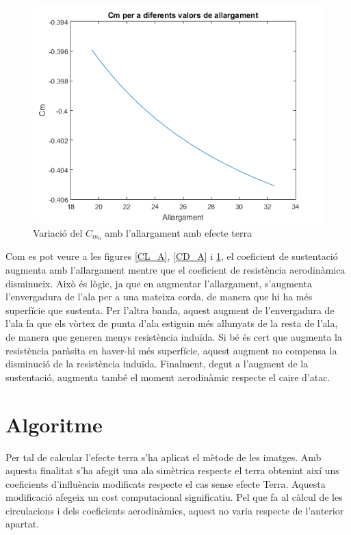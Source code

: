 \begin{figure}[H]
	\centering
	\includegraphics[]{./plots/Cm_A}
	\caption{Variació del $C_{m_{0}}$ amb l'allargament amb efecte terra}
	\label{Cm_A}
\end{figure}

Com es pot veure a les figures \ref{CL_A}, \ref{CD_A} i \ref{Cm_A}, el coeficient de sustentació augmenta amb l'allargament mentre que el coeficient de resistència aerodinàmica disminueix. Això és lògic, ja que en augmentar l'allargament, s'augmenta l'envergadura de l'ala per a una mateixa corda, de manera que hi ha més superfície que sustenta. Per l'altra banda, aquest augment de l'envergadura de l'ala fa que els vòrtex de punta d'ala estiguin més allunyats de la resta de l'ala, de manera que generen menys resistència induïda. Si bé és cert que augmenta la resistència paràsita en haver-hi més superfície, aquest augment no compensa la disminució de la resistència induïda. Finalment, degut a l'augment de la sustentació, augmenta també el moment aerodinàmic respecte el caire d'atac.

\section{Algoritme}
\label{gndAlg}
Per tal de calcular l'efecte terra s'ha aplicat el mètode de les imatges. Amb aquesta finalitat s'ha afegit una ala simètrica respecte el terra obtenint així uns coeficients d'influència modificats respecte el cas sense efecte Terra. Aquesta modificació afegeix un cost computacional significatiu. Pel que fa al càlcul de les circulacions i dels coeficients aerodinàmics, aquest no varia respecte de l'anterior apartat.

